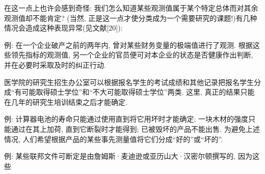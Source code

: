 在这一点上也许会感到奇怪: 我们怎么知道某些观测值属于某个特定总体而对其余观测值却不能肯定? (当然, 正是这一点才使分类成为一个需要研究的课题!)有几种情况会造成这种表现异常(见文献[20]):

\noindent{}

例: 在一个企业破产之前的两年内, 曾对某些财务变量的极端值进行了观测. 根据这些领先指标的观测值, 另一个企业的官员便可对本企业的状态是否健康作出判断, 并在必要时采取及时的纠正行动.

医学院的研究生招生办公室可以根据报名学生的考试成绩和其他记录把报名学生分成“有可能取得硕士学位”和“不大可能取得硕士学位”两类. 这里, 真正的结果只能在几年的研究生培训结束之后才能确定.

\noindent{}

例: 计算器电池的寿命只能通过使用直到将它用坏时才能确定; 一块木材的强度只能通过在其上加荷, 直到它断裂时才能得到; 已被毁坏的产品不能出售. 为避免上述情况, 人们希望根据产品的某些事先测量值将它们分成“好的”或“坏的”.

\noindent{}

例: 某些联邦文件可断定是由詹姆斯·麦迪逊或亚历山大·汉密尔顿撰写的, 因为这些
